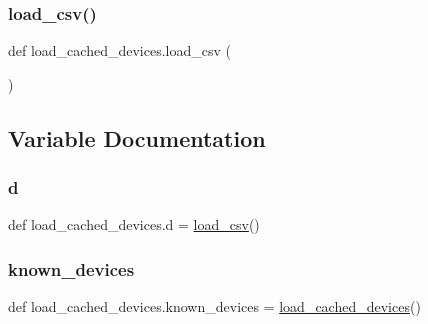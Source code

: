 \subsubsection{\texorpdfstring{load\+\_\+csv()}{load\_csv()}}
{\footnotesize\ttfamily def load\+\_\+cached\+\_\+devices.\+load\+\_\+csv (\begin{DoxyParamCaption}{ }\end{DoxyParamCaption})}



\subsection{Variable Documentation}
\mbox{\label{namespaceload__cached__devices_acdaec1aaba119e6b4e68e9a81ef966a9}} 
\subsubsection{\texorpdfstring{d}{d}}
{\footnotesize\ttfamily def load\+\_\+cached\+\_\+devices.\+d = \hyperlink{namespaceload__cached__devices_a022135c39e44cf17855316761513aec7}{load\+\_\+csv}()}

\mbox{\label{namespaceload__cached__devices_a7b8e627ee267b205ae0d818e015f6359}} 
\subsubsection{\texorpdfstring{known\+\_\+devices}{known\_devices}}
{\footnotesize\ttfamily def load\+\_\+cached\+\_\+devices.\+known\+\_\+devices = \hyperlink{namespaceload__cached__devices_a1b27de57237c60f1affef7e0a898ca0c}{load\+\_\+cached\+\_\+devices}()}

